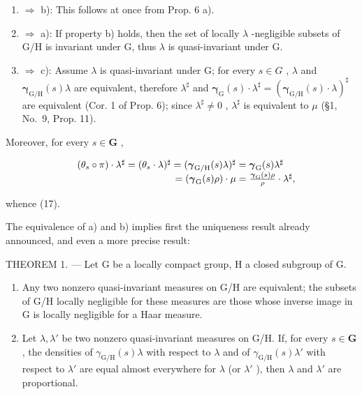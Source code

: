 \begin{enumerate}
\def\labelenumi{\alph{enumi})}
\setcounter{enumi}{2}
\item
  \(\Rightarrow\) b): This follows at once from Prop. 6 a).
\item
  \(\Rightarrow\) a): If property b) holds, then the set of locally \(\lambda\) -negligible subsets of G/H is invariant under G, thus \(\lambda\) is quasi-invariant under G.
\item
  \(\Rightarrow\) c): Assume \(\lambda\) is quasi-invariant under G; for every \(s\in G\) , \(\lambda\) and \(\pmb{\gamma}_{\mathrm{G / H}}(s)\lambda\) are equivalent, therefore \(\lambda^{\sharp}\) and \(\pmb{\gamma}_{\mathrm{G}}(s)\cdot \lambda^{\sharp} = (\pmb{\gamma}_{\mathrm{G / H}}(s)\cdot \lambda)^{\sharp}\) are equivalent (Cor. 1 of Prop. 6); since \(\lambda^{\sharp}\neq 0\) , \(\lambda^{\sharp}\) is equivalent to \(\mu\) (§1, No.~9, Prop. 11).
\end{enumerate}

Moreover, for every \(s \in \mathbf{G}\) ,

\[
\begin{array}{r l} & {(\theta_ {s} \circ \pi) \cdot \lambda^ {\sharp} = (\theta_ {s} \cdot \lambda) ^ {\sharp} = (\boldsymbol {\gamma} _ {\mathrm{G/H}} (s) \lambda) ^ {\sharp} = \boldsymbol {\gamma} _ {\mathrm{G}} (s) \lambda^ {\sharp}} \\ & {\qquad \qquad \qquad \qquad \qquad = (\boldsymbol {\gamma} _ {\mathrm{G}} (s) \rho) \cdot \mu = \frac {\boldsymbol {\gamma} _ {\mathrm{G}} (s) \rho}{\rho} \cdot \lambda^ {\sharp},} \end{array}
\]

whence (17).

The equivalence of a) and b) implies first the uniqueness result already announced, and even a more precise result:

THEOREM 1. --- Let G be a locally compact group, H a closed subgroup of G.

\begin{enumerate}
\def\labelenumi{\alph{enumi})}
\item
  Any two nonzero quasi-invariant measures on G/H are equivalent; the subsets of G/H locally negligible for these measures are those whose inverse image in G is locally negligible for a Haar measure.
\item
  Let \(\lambda, \lambda'\) be two nonzero quasi-invariant measures on G/H. If, for every \(s \in \mathbf{G}\) , the densities of \(\gamma_{\mathrm{G / H}}(s)\lambda\) with respect to \(\lambda\) and of \(\gamma_{\mathrm{G / H}}(s)\lambda'\) with respect to \(\lambda'\) are equal almost everywhere for \(\lambda\) (or \(\lambda'\) ), then \(\lambda\) and \(\lambda'\) are proportional.
\end{enumerate}

